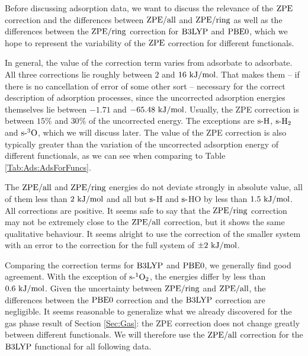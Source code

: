 
Before discussing adsorption data, we want to discuss the relevance of the
$\text{ZPE}$ correction and the differences between $\text{ZPE}/\text{all}$ and $\text{ZPE}/\text{ring}$
as well as the differences between the $\text{ZPE}/\text{ring}$ correction for $\text{B3LYP}$ and
$\text{PBE0}$, which we hope to represent the variability of the
$\text{ZPE}$ correction for different functionals.

In general, the value of the correction term varies from
adsorbate to adsorbate. All three corrections lie roughly between $2$
and $16~\text {kJ/mol}$. That makes them -- if there is no cancellation
of error of some other sort -- necessary for the correct description
of adsorption processes, since the uncorrected adsorption energies
themselves lie between $-1.71$ and $-65.48~\text {kJ/mol}$. Usually, the ZPE correction
is between $15\%$ and $30\%$ of the uncorrected energy. The exceptions are
$\text{s-}{\text H}$, $\text{s-}{\ensuremath{\text H_2}}$ and $\text{s-}{\ensuremath{{^3\text{O}}}}$, which we will discuss later. The
value of the ZPE correction is also typically greater than the variation of the
uncorrected adsorption energy of different functionals, as we can see when
comparing to Table \ref{Tab:Ads:AdsForFuncs}.

The $\text{ZPE}/\text{all}$ and $\text{ZPE}/\text{ring}$ energies
do not deviate strongly in absolute value, all of them less than $2~\text {kJ/mol}$
and all but $\text{s-}$H and $\text{s-}$HO by less than $1.5~\text {kJ/mol}$. All corrections are
positive.
It seems safe to say that the $\text{ZPE}/\text{ring}$ correction may not be extremely
close to the $\text{ZPE}/\text{all}$ correction, but it shows the same qualitative
behaviour. 
It seems alright to use the correction of the smaller system with an error to
the correction for the full system of $\pm 2~\text {kJ/mol}$.

Comparing the correction terms for $\text{B3LYP}$ and $\text{PBE0}$, we generally find
good agreement. With the exception of $\text{s-}{^1\ensuremath{\text O_2}}$, the energies
differ by less than $0.6~\text {kJ/mol}$.
Given the uncertainty between $\text{ZPE}/\text{ring}$ and $\text{ZPE}/\text{all}$, the differences
between the  $\text{PBE0}$ correction and the $\text{B3LYP}$ correction are negligible.
It seems reasonable to generalize what we already discovered for the gas
phase result of Section \ref{Sec:Gas}: the ZPE correction does
not change greatly between different functionals. We will therefore
use the $\text{ZPE}/\text{all}$ correction for the $\text{B3LYP}$ functional for all
following data.

